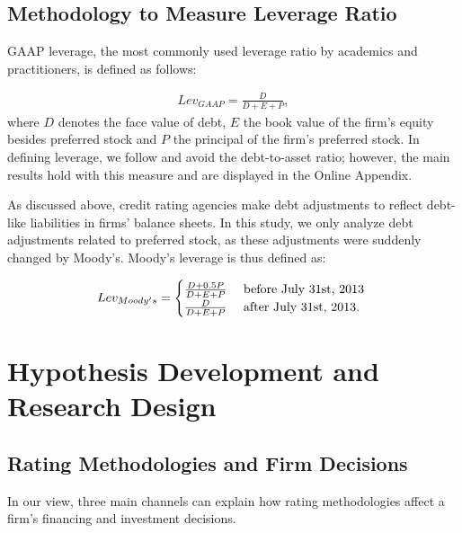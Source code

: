 \documentclass[a4paper, 12pt]{article}
\begin{document}
\subsection{Methodology to Measure Leverage Ratio}\label{sec_ral}


GAAP leverage, the most commonly used leverage ratio by academics and practitioners, is defined as follows:


\begin{align}\label{lev_gaap}
Lev_{GAAP} =  \frac{D}{D+E+P},
\end{align}
where $D$ denotes the face value of debt, $E$  the book value of the firm's equity besides preferred stock and $P$ the principal of the firm's preferred stock. In defining leverage, we follow \cite{welch2011two} and avoid the debt-to-asset ratio; however, the main results hold with this measure and are displayed in the Online Appendix.

As discussed above, credit rating agencies make debt adjustments to reflect debt-like liabilities in firms' balance sheets. In this study, we only analyze debt adjustments related to preferred stock, as these adjustments were suddenly changed by Moody's. Moody's leverage is thus defined as:

\begin{align}\label{RAlev1}
Lev_{Moody's} =
\begin{cases}
 \frac{D +0.5P}{D+E+P} & \textnormal{ before July 31st, 2013 } \\
\frac{D}{D+E+P}  & \textnormal{ after July 31st, 2013.}
\end{cases}
\end{align}


\section{Hypothesis Development and Research Design}

\subsection{Rating Methodologies and Firm Decisions} \label{sec_firmdec}

In our view, three main channels can explain how rating methodologies affect a firm's financing and investment decisions.
\end{document}
